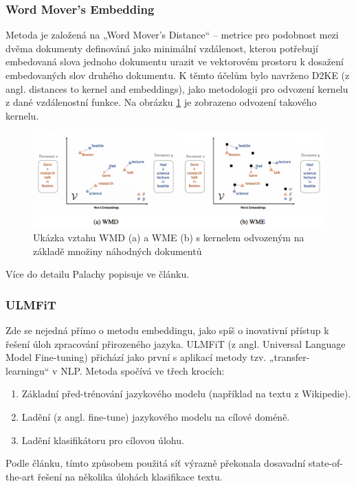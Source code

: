 \documentclass[thesis=M,czech]{FITthesis}[2019/12/23]
\begin{document}

\subsubsection*{Word Mover's Embedding}
Metoda je založená na „Word Mover’s Distance“\cite{kusner2015} -- metrice pro podobnost mezi dvěma dokumenty definováná jako minimální vzdálenost, kterou potřebují embedovaná slova jednoho dokumentu urazit ve vektorovém prostoru k dosažení embedovaných slov druhého dokumentu. K těmto účelům bylo navrženo D2KE (z angl. distances to kernel and embeddings)\cite{wu2018}, jako metodologii pro odvození kernelu z dané vzdálenostní funkce. Na obrázku \ref{fig:palachy2019WME} je zobrazeno odvození takového kernelu.
\begin{figure}\centering
	\includegraphics[width=\textwidth]{images/palachy2019/palachy2019_WME.png}
	\caption{Ukázka vztahu WMD (a) a WME (b) s kernelem odvozeným na základě množiny náhodných dokumentů\cite{palachy2019}}\label{fig:palachy2019WME}
\end{figure}

Více do detailu Palachy popisuje ve článku\cite{palachy2019}.

\subsubsection*{ULMFiT}
Zde se nejedná přímo o metodu embeddingu, jako spíš o inovativní přístup k řešení úloh zpracování přirozeného jazyka. ULMFiT (z angl. Universal Language Model Fine-tuning)\cite{hovard2018} přichází jako první s aplikací metody tzv. „transfer-learningu“ v NLP. Metoda spočívá ve třech krocích:
\begin{enumerate}
    \item Základní před-trénování jazykového modelu (například na textu z Wikipedie).
    \item Ladění (z angl. fine-tune) jazykového modelu na cílové doméně.
    \item Ladění klasifikátoru pro cílovou úlohu.
\end{enumerate}
Podle článku\cite{ghelani2019}, tímto způsobem použitá síť výrazně překonala dosavadní state-of-the-art řešení na několika úlohách klasifikace textu.
\end{document}
